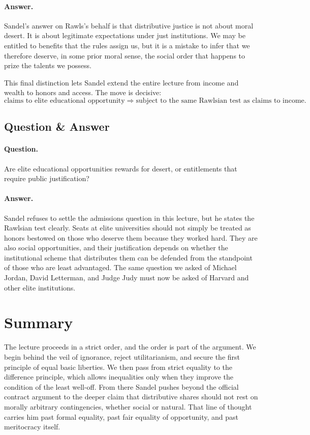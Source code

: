 \paragraph{Answer.} Sandel's answer on Rawls's behalf is that distributive justice is not about moral desert. It is about legitimate expectations under just institutions. We may be entitled to benefits that the rules assign us, but it is a mistake to infer that we therefore deserve, in some prior moral sense, the social order that happens to prize the talents we possess.

This final distinction lets Sandel extend the entire lecture from income and wealth to honors and access. The move is decisive:
\begin{equation}
\text{claims to elite educational opportunity}
\Longrightarrow
\text{subject to the same Rawlsian test as claims to income}.
\end{equation}

\subsection{Question \& Answer}

\paragraph{Question.} Are elite educational opportunities rewards for desert, or entitlements that require public justification?

\paragraph{Answer.} Sandel refuses to settle the admissions question in this lecture, but he states the Rawlsian test clearly. Seats at elite universities should not simply be treated as honors bestowed on those who deserve them because they worked hard. They are also social opportunities, and their justification depends on whether the institutional scheme that distributes them can be defended from the standpoint of those who are least advantaged. The same question we asked of Michael Jordan, David Letterman, and Judge Judy must now be asked of Harvard and other elite institutions.

\section{Summary}

The lecture proceeds in a strict order, and the order is part of the argument. We begin behind the veil of ignorance, reject utilitarianism, and secure the first principle of equal basic liberties. We then pass from strict equality to the difference principle, which allows inequalities only when they improve the condition of the least well-off. From there Sandel pushes beyond the official contract argument to the deeper claim that distributive shares should not rest on morally arbitrary contingencies, whether social or natural. That line of thought carries him past formal equality, past fair equality of opportunity, and past meritocracy itself.

